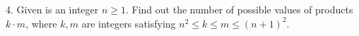 4. Given is an integer $n\geq 1$. Find out the number of possible values of products $k \cdot m$, where $k,m$ are integers satisfying $n^{2}\leq k \leq m \leq (n+1)^{2}$.